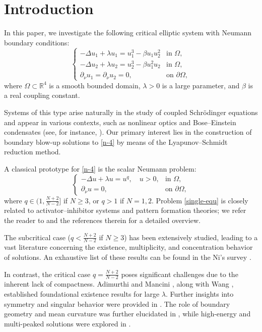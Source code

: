 \documentclass[a4paper,reqno,11pt,oneside]{amsart}
\numberwithin{equation}{section}
\begin{document}
\section{Introduction}
In this paper, we investigate the following critical elliptic system with Neumann boundary conditions:
\begin{equation}\label{n-4}
\begin{cases}
-\Delta u_1+\lambda u_1=u_1^3-\beta u_1u_2^2  & \text{in }\Omega,\\
-\Delta u_2+\lambda u_2=u_2^3-\beta u_1^2u_2 & \text{in }\Omega,\\
\partial_\nu u_1=\partial_\nu u_2=0, & \text{on }\partial\Omega,
\end{cases}
\end{equation}
where $\Omega\subset \mathbb{R}^4$ is a smooth bounded domain, $\lambda>0$ is a large parameter, and $\beta$ is a real coupling constant.

Systems of this type arise naturally in the study of coupled Schrödinger equations and appear in various contexts, such as nonlinear optics and Bose--Einstein condensates (see, for instance, \cite{Phy1,phy-2}). Our primary interest lies in the construction of boundary blow-up solutions to \eqref{n-4} by means of the Lyapunov--Schmidt reduction method.

A classical prototype for \eqref{n-4} is the scalar Neumann problem:
\begin{equation}\label{single-equ}
\begin{cases}
-\Delta u+\lambda u=u^q,\quad u>0, & \text{in }\Omega,\\
\partial_\nu u=0, & \text{on }\partial\Omega,
\end{cases}
\end{equation}
where $q\in (1,\frac{N+2}{N-2}]$ if $N\ge 3$, or $q>1$ if $N=1,2$. Problem \eqref{single-equ} is closely related to activator--inhibitor systems and pattern formation theories; we refer the reader to \cite{wei-yan-24} and the references therein for a detailed overview.

The subcritical case ($q < \frac{N+2}{N-2}$ if $N\ge3$) has been extensively studied, leading to a vast literature concerning the existence, multiplicity, and concentration behavior of solutions. An exhaustive list of these results can be found in the Ni's survey \cite{wei-yan-24}.

In contrast, the critical case $q=\frac{N+2}{N-2}$ poses significant challenges due to the inherent lack of compactness. Adimurthi and Mancini \cite{adi-man}, along with Wang \cite{rey-1997-20}, established foundational existence results for large $\lambda$. Further insights into symmetry and singular behavior were provided in \cite{wei-rey-26,wei-rey-28}. The role of boundary geometry and mean curvature was further elucidated in \cite{wei-rey-2,rey-1999-3,rey-1999-4,wei-rey-36}, while high-energy and multi-peaked solutions were explored in \cite{wei-rey-37,wei-rey-38}. 
\end{document}
